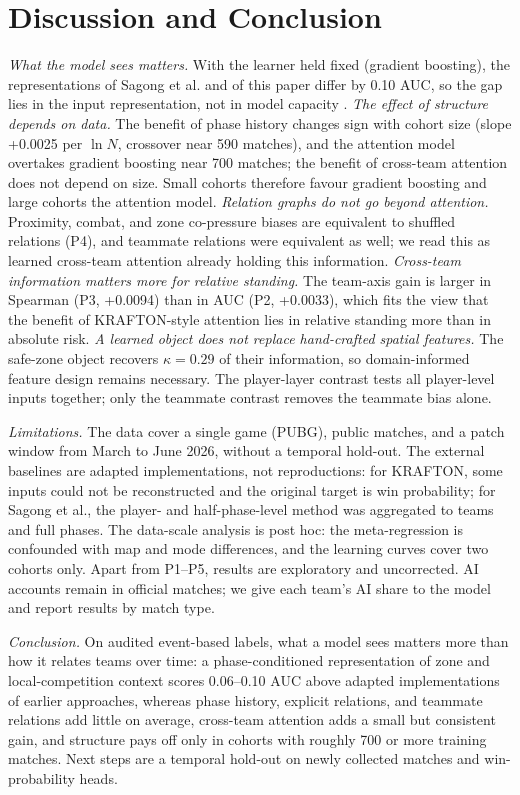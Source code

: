 \section{Discussion and Conclusion}\label{sec:discussion}

\emph{What the model sees matters.} With the learner held fixed (gradient boosting), the representations of Sagong et al. and of this paper differ by 0.10 AUC, so the gap lies in the input representation, not in model capacity . \emph{The effect of structure depends on data.} The benefit of phase history changes sign with cohort size (slope +0.0025 per $\ln N$, crossover near 590 matches), and the attention model overtakes gradient boosting near 700 matches; the benefit of cross-team attention does not depend on size. Small cohorts therefore favour gradient boosting and large cohorts the attention model. \emph{Relation graphs do not go beyond attention.} Proximity, combat, and zone co-pressure biases are equivalent to shuffled relations (P4), and teammate relations were equivalent as well; we read this as learned cross-team attention already holding this information. \emph{Cross-team information matters more for relative standing.} The team-axis gain is larger in Spearman (P3, +0.0094) than in AUC (P2, +0.0033), which fits the view that the benefit of KRAFTON-style attention lies in relative standing more than in absolute risk. \emph{A learned object does not replace hand-crafted spatial features.} The safe-zone object recovers $\kappa=0.29$ of their information, so domain-informed feature design remains necessary.
The player-layer contrast tests all player-level inputs together; only the teammate contrast removes the teammate bias alone.

\emph{Limitations.} The data cover a single game (PUBG), public matches, and a patch window from March to June 2026, without a temporal hold-out. The external baselines are adapted implementations, not reproductions: for KRAFTON, some inputs could not be reconstructed and the original target is win probability; for Sagong et al., the player- and half-phase-level method was aggregated to teams and full phases. The data-scale analysis is post hoc: the meta-regression is confounded with map and mode differences, and the learning curves cover two cohorts only. Apart from P1--P5, results are exploratory and uncorrected. AI accounts remain in official matches; we give each team's AI share to the model and report results by match type.

\emph{Conclusion.} On audited event-based labels, what a model sees matters more than how it relates teams over time: a phase-conditioned representation of zone and local-competition context scores 0.06--0.10 AUC above adapted implementations of earlier approaches, whereas phase history, explicit relations, and teammate relations add little on average, cross-team attention adds a small but consistent gain, and structure pays off only in cohorts with roughly 700 or more training matches. Next steps are a temporal hold-out on newly collected matches and win-probability heads.
